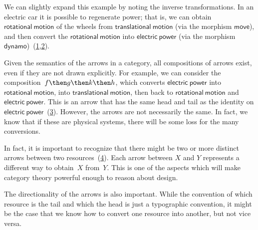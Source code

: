 We can slightly expand this example by noting the inverse transformations. In an electric car
it is possible to regenerate power; that is, we can obtain $\mathsf{rotational}\ \mathsf{motion}$ of the wheels from
$\mathsf{translational}\ \mathsf{motion}$ (via the morphism $\mathsf{move}$), and then convert the $\mathsf{rotational}\ \mathsf{motion}$ into $\mathsf{electric}\ \mathsf{power}$ (via the morphism $\mathsf{dynamo}$)~(\cref{fig:e6},\cref{fig:e6-together}).


\begin{figure}[h!]
    \centering
    \caption{\label{fig:e6}}
\end{figure}


\begin{figure}[h!]
    \centering
    \caption{\label{fig:e6-together}}
\end{figure}

Given the semantics of the arrows in a category, all compositions of arrows exist, even if they are not drawn
explicitly. For example, we can consider the composition~$f\then g \then k \then h$, which
converts $\mathsf{electric}\ \mathsf{power}$ into $\mathsf{rotational}\ \mathsf{motion}$, into $\mathsf{translational}\ \mathsf{motion}$, then back to
$\mathsf{rotational}\ \mathsf{motion}$ and $\mathsf{electric}\ \mathsf{power}$. This is an arrow that has the same head and tail as the identity on $\mathsf{electric}\ \mathsf{power}$~(\cref{fig:e8}). However, the arrows are not necessarily the same. In fact, we know that if these are physical systems, there will be some loss for the many conversions.

\begin{figure}[h!]
    \centering
    \caption{\label{fig:e8}}
\end{figure}

In fact, it is important to recognize that there might be two or more distinct arrows between two resources~(\cref{fig:e9}). Each arrow between $X$ and $Y$ represents a different way  to obtain~$X$ from~$Y$. This is one of the aspects which will make category theory powerful enough to reason about design.

\begin{figure}[h!]
    \centering
    \caption{\label{fig:e9}}
\end{figure}

The directionality of the arrows is also important. While the convention of
which resource is the tail and which the head is just a typographic convention,
it might be the case that we know how to convert one resource into another, but
not vice versa.

